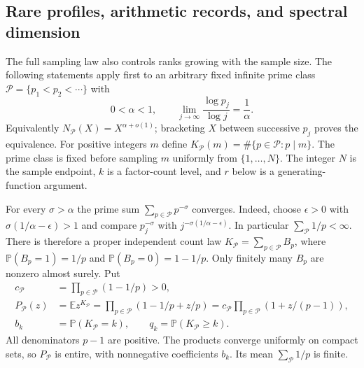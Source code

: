 \documentclass[11pt]{article}
\theoremstyle{definition}
\begin{document}
\subsection{Rare profiles, arithmetic records, and spectral dimension}
\label{sec:thin-prime-profile}

The full sampling law also controls ranks growing with the
sample size.  The following statements apply first to an arbitrary
fixed infinite prime class $\mathcal P=\{p_1<p_2<\cdots\}$ with
\begin{equation}
 0<\alpha<1,\qquad
 \lim_{j\to\infty}\frac{\log p_j}{\log j}=\frac1\alpha .
 \label{eq:thin-prime-index-hypothesis}
\end{equation}
Equivalently $N_{\mathcal P}(X)=X^{\alpha+o(1)}$;
bracketing $X$ between successive $p_j$ proves the equivalence.
For positive integers $m$ define
$K_{\mathcal P}(m)=\#\{p\in\mathcal P:p\mid m\}$.
The prime class is fixed before sampling $m$ uniformly from
$\{1,\ldots,N\}$.  The integer $N$ is the sample endpoint,
$k$ is a factor-count level, and $r$ below is a generating-function
argument.

For every $\sigma>\alpha$ the prime sum
$\sum_{p\in\mathcal P}p^{-\sigma}$ converges.
Indeed, choose $\epsilon>0$ with
$\sigma(1/\alpha-\epsilon)>1$ and compare
$p_j^{-\sigma}$ with $j^{-\sigma(1/\alpha-\epsilon)}$.
In particular $\sum_{\mathcal P}1/p<\infty$.
There is therefore a proper independent count law
$K_{\mathcal P}=\sum_{p\in\mathcal P}B_p$, where
$\mathbb P(B_p=1)=1/p$ and $\mathbb P(B_p=0)=1-1/p$.
Only finitely many $B_p$ are nonzero almost surely.
Put
\begin{equation}
 \begin{aligned}
 c_{\mathcal P}&=\prod_{p\in\mathcal P}(1-1/p)>0,\\
 P_{\mathcal P}(z)
   &=\mathbb E z^{K_{\mathcal P}}
     =\prod_{p\in\mathcal P}(1-1/p+z/p)
     =c_{\mathcal P}\prod_{p\in\mathcal P}
                              (1+z/(p-1)),\\
 b_k&=\mathbb P(K_{\mathcal P}=k),\qquad
 q_k=\mathbb P(K_{\mathcal P}\ge k).
 \end{aligned}
 \label{eq:thin-prime-profile-definitions}
\end{equation}
All denominators $p-1$ are positive.
The products converge uniformly on compact sets, so
$P_{\mathcal P}$ is entire, with nonnegative coefficients $b_k$.
Its mean $\sum_{\mathcal P}1/p$ is finite.
\end{document}
